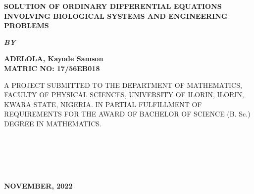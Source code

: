 \documentclass[11pt]{report}
\newcommand{\sps}{\\[0.2cm]}
\newcommand{\bt}[1]{\textbf{#1}}
\begin{document}
	
	\clearpage
	\thispagestyle{empty}
	\begin{center}
		\Large \bt{SOLUTION OF ORDINARY DIFFERENTIAL EQUATIONS INVOLVING BIOLOGICAL SYSTEMS AND ENGINEERING PROBLEMS}
	\end{center}

	\hspace{7cm}
	
	\begin{center}
		\textbf{\textit{BY}}
	\end{center}

	\hspace{5cm}
	
	\begin{center}
		\large \textbf{ADELOLA, Kayode Samson
			\\
			MATRIC NO: 17/56EB018}
	\end{center}
	\hspace{9cm}
	\begin{center}
		A PROJECT SUBMITTED TO THE DEPARTMENT OF MATHEMATICS, FACULTY OF PHYSICAL SCIENCES, UNIVERSITY OF ILORIN, ILORIN, KWARA STATE, NIGERIA. IN PARTIAL FULFILLMENT OF REQUIREMENTS FOR THE AWARD OF BACHELOR OF SCIENCE (B. Sc.) DEGREE IN MATHEMATICS.
	\end{center}
	~~~~~\\\sps
	\hspace{7cm}
	~~~~~\\\sps
	\begin{center}
		\textbf{NOVEMBER, 2022}
	\end{center}

	\newpage
\end{document}
